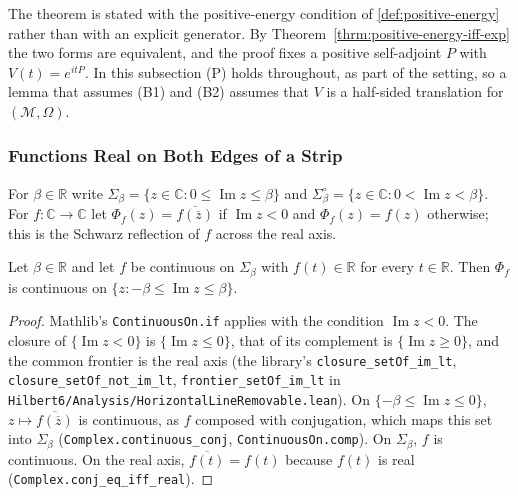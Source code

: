 The theorem is stated with the positive-energy condition of \ref{def:positive-energy} rather than with an explicit generator. By Theorem~\ref{thrm:positive-energy-iff-exp} the two forms are equivalent, and the proof fixes a positive self-adjoint $P$ with $V(t) = e^{itP}$. In this subsection (P) holds throughout, as part of the setting, so a lemma that assumes (B1) and (B2) assumes that $V$ is a half-sided translation for $(\mathcal{M}, \Omega)$.

\subsubsection{Functions Real on Both Edges of a Strip}

For $\beta \in \mathbb{R}$ write $\Sigma_\beta = \{ z \in \mathbb{C} : 0 \le \operatorname{Im} z \le \beta \}$ and $\Sigma^\circ_\beta = \{ z \in \mathbb{C} : 0 < \operatorname{Im} z < \beta \}$. For $f : \mathbb{C} \to \mathbb{C}$ let $\Phi_f(z) = \overline{f(\overline{z})}$ if $\operatorname{Im} z < 0$ and $\Phi_f(z) = f(z)$ otherwise; this is the Schwarz reflection of $f$ across the real axis.

\begin{lemma}
    \label{lmm:strip-reflection-continuous}
    \leanok
    Let $\beta \in \mathbb{R}$ and let $f$ be continuous on $\Sigma_\beta$ with $f(t) \in \mathbb{R}$ for every $t \in \mathbb{R}$. Then $\Phi_f$ is continuous on $\{ z : -\beta \le \operatorname{Im} z \le \beta \}$.
\end{lemma}
\begin{proof}
    \leanok
    Mathlib's \texttt{ContinuousOn.if} applies with the condition $\operatorname{Im} z < 0$. The closure of $\{\operatorname{Im} z < 0\}$ is $\{\operatorname{Im} z \le 0\}$, that of its complement is $\{\operatorname{Im} z \ge 0\}$, and the common frontier is the real axis (the library's \texttt{closure\_setOf\_im\_lt}, \texttt{closure\_setOf\_not\_im\_lt}, \texttt{frontier\_setOf\_im\_lt} in \texttt{Hilbert6/Analysis/HorizontalLineRemovable.lean}). On $\{-\beta \le \operatorname{Im} z \le 0\}$, $z \mapsto \overline{f(\overline{z})}$ is continuous, as $f$ composed with conjugation, which maps this set into $\Sigma_\beta$ (\texttt{Complex.continuous\_conj}, \texttt{ContinuousOn.comp}). On $\Sigma_\beta$, $f$ is continuous. On the real axis, $\overline{f(t)} = f(t)$ because $f(t)$ is real (\texttt{Complex.conj\_eq\_iff\_real}).
\end{proof}

